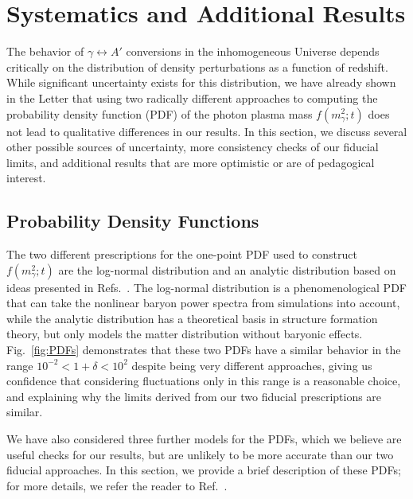 \documentclass[prd,aps,10pt,nofootinbib,twocolumn,superscriptaddress,preprintnumbers,balancelastpage,longbibliography]{revtex4-1}
\begin{document}
\section{Systematics and Additional Results}
\label{app:systematics}

The behavior of $\gamma \leftrightarrow A'$ conversions in the inhomogeneous Universe depends critically on the distribution of density perturbations as a function of redshift. While significant uncertainty exists for this distribution, we have already shown in the Letter that using two radically different approaches to computing the probability density function (PDF) of the photon plasma mass $f(m_\gamma^2;t)$ does not lead to qualitative differences in our results. In this section, we discuss several other possible sources of uncertainty, more consistency checks of our fiducial limits, and additional results that are more optimistic or are of pedagogical interest. 

\subsection{Probability Density Functions}

The two different prescriptions for the one-point PDF used to construct $f(m_\gamma^2;t)$ are the log-normal distribution and an analytic distribution based on ideas presented in Refs.~\cite{Valageas:2001zr,Bernardeau:2015khs,Uhlemann:2015npz,BetancortRijo:2001ge,Lam:2007qw,Ivanov:2018lcg}. The log-normal distribution is a phenomenological PDF that can take the nonlinear baryon power spectra from simulations into account, while the analytic distribution has a theoretical basis in structure formation theory, but only models the matter distribution without baryonic effects. Fig.~\ref{fig:PDFs} demonstrates that these two PDFs have a similar behavior in the range $10^{-2} < 1 + \delta < 10^2$ despite being very different approaches, giving us confidence that considering fluctuations only in this range is a reasonable choice, and explaining why the limits derived from our two fiducial prescriptions are similar.

We have also considered three further models for the PDFs, which we believe are useful checks for our results, but are unlikely to be more accurate than our two fiducial approaches. In this section, we provide a brief description of these PDFs; for more details, we refer the reader to Ref.~\cite{OurLongPaper}.
\end{document}
